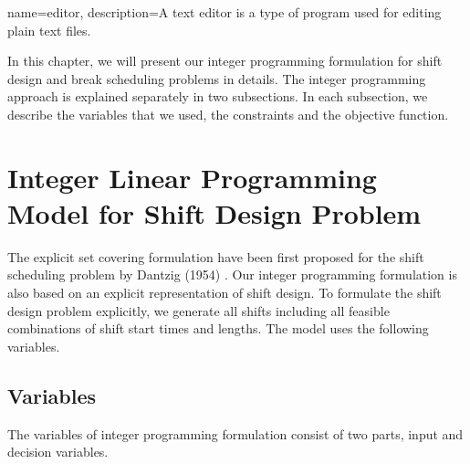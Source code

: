 %
%
%
%



{
  name={editor},
  description={A text editor is a type of program used for editing plain text files.}
}

In this chapter, we will present our integer programming formulation for shift design and break scheduling problems in details.  The integer programming approach is explained separately in two subsections. In each subsection, we describe the variables that we used, the constraints and the objective function. 

\section{Integer Linear Programming Model for Shift Design Problem}

The explicit set covering formulation have been first proposed for the shift scheduling problem by Dantzig (1954) \cite{li:1954:dantzig}. Our integer programming formulation is also based on an explicit representation of shift design. To formulate the shift design problem explicitly, we generate all shifts including all feasible combinations of shift start times and lengths. The model uses the following variables.

\subsection{Variables}

The variables of integer programming formulation consist of two parts, input and decision variables.

